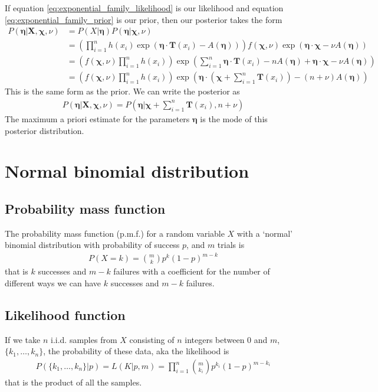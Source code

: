 \documentclass[a4paper,12pt]{article}
\theoremstyle{definition}
\begin{document}
If equation \ref{eq:exponential_family_likelihood} is our likelihood and equation \ref{eq:exponential_family_prior} is our prior, then our posterior takes the form
\begin{align}
  P(\boldsymbol{\eta} | \mathbf{X}, \boldsymbol{\chi}, \nu) & = P(X | \boldsymbol{\eta}) P(\boldsymbol{\eta} | \boldsymbol{\chi}, \nu) \\
  & = \left( \prod_{i=1}^n h(x_i) \exp \left( \boldsymbol{\eta}\cdot \mathbf{T}(x_i) - A(\boldsymbol{\eta}) \right) \right) f(\boldsymbol{\chi}, \nu)\exp (\boldsymbol{\eta} \cdot \boldsymbol{\chi} - \nu A(\boldsymbol{\eta})) \\ 
  & = \left( f(\boldsymbol{\chi}, \nu) \prod_{i=1}^n h(x_i) \right) \exp \left( \sum_{i=1}^n \boldsymbol{\eta} \cdot \mathbf{T}(x_i) - nA(\boldsymbol{\eta}) + \boldsymbol{\eta} \cdot \boldsymbol{\chi} - \nu A(\boldsymbol{\eta}) \right) \\
  & = \left( f(\boldsymbol{\chi}, \nu) \prod_{i=1}^n h(x_i) \right) \exp \left( \boldsymbol{\eta} \cdot \left(\boldsymbol{\chi} + \sum_{i=1}^n\mathbf{T}(x_i) \right) - (n + \nu) A(\boldsymbol{\eta}) \right)
\end{align}
This is the same form as the prior. We can write the posterior as 
\begin{align}
  P(\boldsymbol{\eta} | \mathbf{X}, \boldsymbol{\chi}, \nu) = P (\boldsymbol{\eta} | \boldsymbol{\chi} + \sum_{i=1}^n\mathbf{T}(x_i) , n + \nu )
\end{align}
The maximum a priori estimate for the parameters $\boldsymbol{\eta}$ is the mode of this posterior distribution.

\section{Normal binomial distribution}\label{normal}
\subsection{Probability mass function}
The probability mass function (p.m.f.) for a random variable $X$ with a `normal' binomial distribution with probability of success $p$, and $m$ trials is
\begin{align}
  P(X=k) = \binom{m}{k} p^k (1-p)^{m-k}
\end{align}
that is $k$ successes and $m-k$ failures with a coefficient for the number of different ways we can have $k$ successes and $m-k$ failures. 

\subsection{Likelihood function}
If we take $n$ i.i.d. samples from $X$ consisting of $n$ integers between $0$ and $m$, $\lbrace k_1, \dots , k_n \rbrace$, the probability of these data, aka the likelihood is
\begin{align}
  P(\lbrace k_1, \dots , k_n \rbrace | p) = L(K|p, m) = \prod_{i=1}^n \binom{m}{k_i} p^{k_i}(1-p)^{m-k_i}
\end{align}
that is the product of all the samples.
\end{document}
